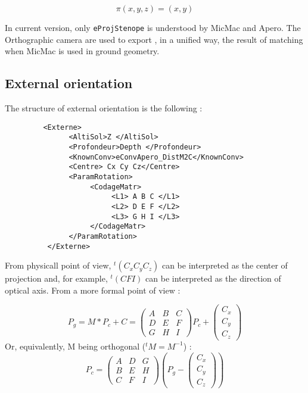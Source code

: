 \begin{equation}
    \pi(x,y,z) =  (x,y) \label{Proj:Ortho} 
\end{equation}

In current version, only {\tt eProjStenope} is understood by MicMac and Apero. The Orthographic
camera are used to export , in a unified way, the result of matching when
MicMac is used in ground geometry.


\subsection{External orientation}

The structure of external orientation is the following :

\begin{verbatim}
         <Externe>
               <AltiSol>Z </AltiSol>
               <Profondeur>Depth </Profondeur>
               <KnownConv>eConvApero_DistM2C</KnownConv>
               <Centre> Cx Cy Cz</Centre>
               <ParamRotation>
                    <CodageMatr>
                         <L1> A B C </L1>
                         <L2> D E F </L2>
                         <L3> G H I </L3>
                    </CodageMatr>
               </ParamRotation>
          </Externe>
\end{verbatim}

From physicall point of view,  $^t(C_x C_y C_z) $ can be interpreted 
as the center of projection and, for example,  $^t(C F I)$ can be interpreted as the
direction of optical axis.
From a more formal point of view :

\begin{equation}
 P_g =  M*P_c+ C = \begin{pmatrix}A&B&C \\  D&E&F\\ G&H&I \end{pmatrix}P_c +  \begin{pmatrix} C_x \\C_y\\C_z \end{pmatrix} 
\end{equation}
Or, equivalently, M being orthogonal ($^t M = M ^{-1}$) :
\begin{equation}
 P_c =  \begin{pmatrix}A&D&G \\  B&E&H\\ C&F&I \end{pmatrix} (P_g-\begin{pmatrix} C_x \\C_y\\C_z \end{pmatrix} )
\end{equation}

